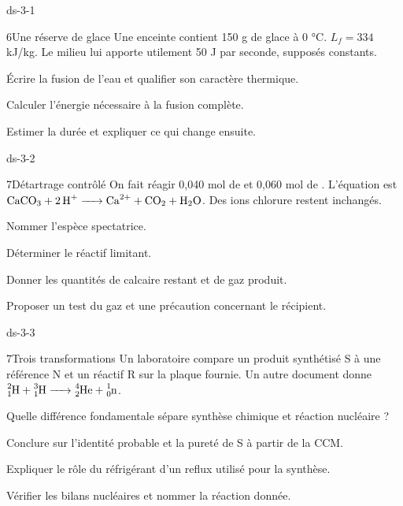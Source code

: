 \begin{blocLivre}{ds-3-1}\begin{exoBac}{6}{Une réserve de glace}
Une enceinte contient 150 g de glace à 0 °C. $L_f=334$ kJ/kg. Le milieu lui apporte utilement 50 J par seconde, supposés constants.
\begin{questions}
\item Écrire la fusion de l’eau et qualifier son caractère thermique.
\item Calculer l’énergie nécessaire à la fusion complète.
\item Estimer la durée et expliquer ce qui change ensuite.
\end{questions}
\end{exoBac}\end{blocLivre}
\begin{blocLivre}{ds-3-2}\begin{exoBac}{7}{Détartrage contrôlé}
On fait réagir 0,040 mol de  et 0,060 mol de . L’équation est $\ce{CaCO3 + 2 H+ -> Ca^{2+} + CO2 + H2O}$. Des ions chlorure restent inchangés.
\begin{questions}
\item Nommer l’espèce spectatrice.
\item Déterminer le réactif limitant.
\item Donner les quantités de calcaire restant et de gaz produit.
\item Proposer un test du gaz et une précaution concernant le récipient.
\end{questions}
\end{exoBac}\end{blocLivre}
\begin{blocLivre}{ds-3-3}\begin{exoBac}{7}{Trois transformations}
Un laboratoire compare un produit synthétisé S à une référence N et un réactif R sur la plaque fournie. Un autre document donne $\ce{^{2}_{1}H + ^{3}_{1}H -> ^{4}_{2}He + ^{1}_{0}n}$.
\begin{questions}
\item Quelle différence fondamentale sépare synthèse chimique et réaction nucléaire ?
\item Conclure sur l’identité probable et la pureté de S à partir de la CCM.
\item Expliquer le rôle du réfrigérant d’un reflux utilisé pour la synthèse.
\item Vérifier les bilans nucléaires et nommer la réaction donnée.
\end{questions}
\end{exoBac}\end{blocLivre}

